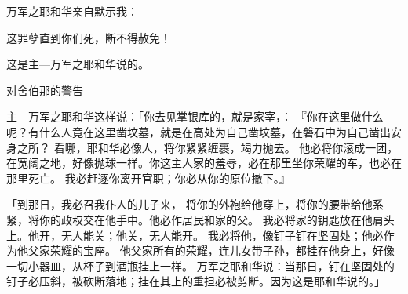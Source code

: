 {\par }{\Q {}万军之耶和华亲自默示我{}：
\par }{\Q 这罪孽直到你们死，断不得赦免！
\par }{\Q 这是主—万军之耶和华说的。
\par }{\SH 对舍伯那的警告
\par }{\PP {}主—万军之耶和华这样说：「你去见掌银库的，就是家宰{}，{}：
『你在这里做什么呢？有什么人竟在这里凿坟墓，就是在高处为自己凿坟墓，在磐石中为自己凿出安身之所？
看哪，耶和华必像{}人，将你紧紧缠裹，竭力抛去。
他必将你滚成一团，{}在宽阔之地，好像抛球一样。你这主人家的羞辱，必在那里坐你荣耀的车，也必在那里死亡。
我必赶逐你离开官职；你必从你的原位撤下。』
\par }{\PP {}「到那日，我必召我仆人{}的儿子{}来，
将你的外袍给他穿上，将你的腰带给他系紧，将你的政权交在他手中。他必作{}居民和{}家的父。
我必将{}家的钥匙放在他肩头上。他开，无人能关；他关，无人能开。
我必将他{}，像钉子钉在坚固处；他必作为他父家荣耀的宝座。
他父家所有的荣耀，连儿女带子孙，都挂在他身上，好像一切小器皿，从杯子到酒瓶挂上一样。
万军之耶和华说：当那日，钉在坚固处的钉子必压斜，被砍断落地；挂在其上的重担必被剪断。因为这是耶和华说的。」

}
